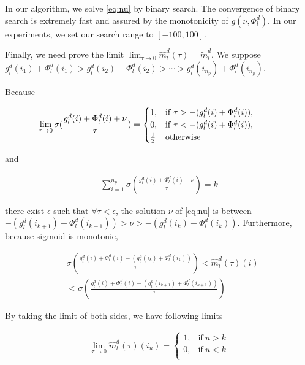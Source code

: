 \documentclass[11pt]{article}
\begin{document}
In our algorithm, we solve \eqref{eq:nu} by binary search. The convergence of binary search is extremely fast and assured by the monotonicity of $g(\nu,\Phi_l^d)$. In our experiments, we set our search range to $[-100,100]$.

Finally, we need prove the limit $\lim_{\tau \rightarrow 0}\hat{m}_l^d(\tau) = \tilde{m}_l^d$. We suppose $g_l^d(i_1) + \Phi_l^d(i_1) > g_l^d(i_2) + \Phi_l^d(i_2) > \cdots > g_l^d(i_{n_p}) + \Phi_l^d(i_{n_p})$.

Because

\begin{align*}
\hspace{-3.em}
\lim_{\tau \rightarrow 0} \sigma(\frac{g_l^d(i) + \Phi_l^d(i) + \nu}{\tau}) = \begin{cases}
      1, & \text{if}\ \tau > - (g_l^d(i) + \Phi_l^d(i)), \\
      0, & \text{if}\ \tau < - (g_l^d(i) + \Phi_l^d(i)), \\
      \frac{1}{2} &\text{otherwise}\\
    \end{cases}
\end{align*}

and 

\begin{align*}
\displaystyle{\mathop{\sum}_{i=1}^{n_p}} \sigma(\frac{g_l^d(i) + \Phi_l^d(i) + \nu}{\tau}) = k
\end{align*}

there exist $\epsilon$ such that $\forall \tau < \epsilon$, the solution $\bar{\nu}$ of \eqref{eq:nu} is between $- (g_l^d(i_{k+1}) + \Phi_l^d(i_{k+1})) > \bar{\nu} > - (g_l^d(i_k) + \Phi_l^d(i_k))$. Furthermore, because sigmoid is monotonic,

\begin{align*}
&\sigma(\frac{g_l^d(i) + \Phi_l^d(i) - (g_l^d(i_{k}) + \Phi_l^d(i_{k}))}{\tau}) < \hat{m}_l^d(\tau)(i)  \\
& < \sigma(\frac{g_l^d(i) + \Phi_l^d(i) - (g_l^d(i_{k+1}) + \Phi_l^d(i_{k+1}))}{\tau}) 
\end{align*}

By taking the limit of both sides, we have following limits

\begin{align*}
\lim_{\tau \rightarrow 0} \hat{m}_l^d(\tau)(i_u) = \begin{cases}
      1, & \text{if}\ u > k \\
      0, & \text{if}\ u < k \\
    \end{cases}
\end{align*}
\end{document}
